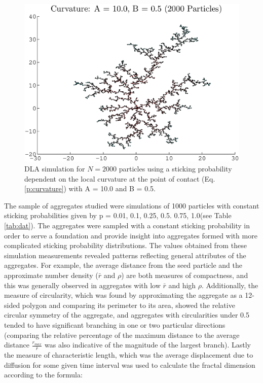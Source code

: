 \documentclass{article}
\begin{document}
\begin{figure}
\begin{center}
	\includegraphics[width=\textwidth]{curve_10005.eps}
	\caption{DLA simulation for $N=2000$ particles using a sticking probability dependent on the local curvature at the point of contact (Eq. \ref{p:curvature}) with A = 10.0 and B = 0.5. }
	\label{fig:curve}
\end{center}
\end{figure}

The sample of aggregates studied were simulations of 1000 particles with constant sticking probabilities given by p = {0.01, 0.1, 0.25, 0.5. 0.75, 1.0}(see Table \ref{tab:dat}). The aggregates were sampled with a constant sticking probability in order to serve a foundation and provide insight into aggregates formed with more complicated sticking probability distributions. The values obtained from these simulation measurements revealed patterns reflecting general attributes of the aggregates. For example, the average distance from the seed particle and the approximate number density  ($\bar{r}$ and $\rho$) are both measures of compactness, and this was generally observed in aggregates with  low $\bar{r}$ and high $\rho$. Additionally, the measure of circularity, which was found by approximating the aggregate as a 12-sided polygon and comparing its perimeter to its area, showed the relative circular symmetry of the aggregate, and aggregates with circularities under 0.5 tended to have significant branching in one or two particular directions (comparing the relative percentage of the maximum distance to the average distance $\frac{r_{max}}{\bar{r}}$ was also indicative of the magnitude of the largest branch). Lastly the measure of characteristic length, which was the average displacement due to diffusion for some given time interval was used to calculate the fractal dimension according to the formula:
\end{document}
